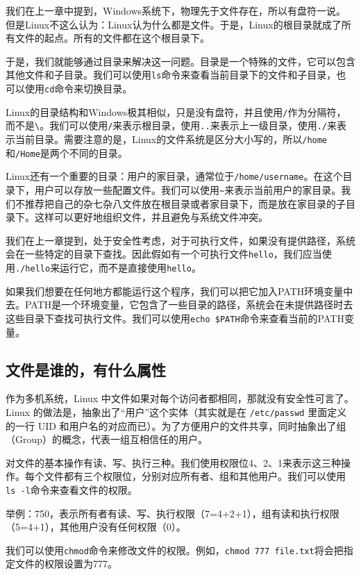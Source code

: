 \documentclass[../main.tex]{subfiles}
\begin{document}
我们在上一章中提到，Windows系统下，物理先于文件存在，所以有盘符一说。但是Linux不这么认为：Linux认为什么都是文件。于是，Linux的根目录\text{/}就成了所有文件的起点。所有的文件都在这个根目录下。

于是，我们就能够通过目录来解决这一问题。目录是一个特殊的文件，它可以包含其他文件和子目录。我们可以使用\texttt{ls}命令来查看当前目录下的文件和子目录，也可以使用\texttt{cd}命令来切换目录。

Linux的目录结构和Windows极其相似，只是没有盘符，并且使用\texttt{/}作为分隔符，而不是\texttt{\textbackslash}。我们可以使用\texttt{/}来表示根目录，使用\texttt{..}来表示上一级目录，使用\texttt{./}来表示当前目录。需要注意的是，Linux的文件系统是区分大小写的，所以\texttt{/home}和\texttt{/Home}是两个不同的目录。

Linux还有一个重要的目录：用户的家目录，通常位于\texttt{/home/username}。在这个目录下，用户可以存放一些配置文件。我们可以使用\texttt{\textasciitilde}来表示当前用户的家目录。我们不推荐把自己的杂七杂八文件放在根目录或者家目录下，而是放在家目录的子目录下。这样可以更好地组织文件，并且避免与系统文件冲突。

我们在上一章提到，处于安全性考虑，对于可执行文件，如果没有提供路径，系统会在一些特定的目录下查找。因此假如有一个可执行文件\texttt{hello}，我们应当使用\texttt{./hello}来运行它，而不是直接使用\texttt{hello}。

如果我们想要在任何地方都能运行这个程序，我们可以把它加入PATH环境变量中去。PATH是一个环境变量，它包含了一些目录的路径，系统会在未提供路径时去这些目录下查找可执行文件。我们可以使用\texttt{echo \$PATH}命令来查看当前的PATH变量。

\subsection{文件是谁的，有什么属性}

作为多机系统，Linux 中文件如果对每个访问者都相同，那就没有安全性可言了。Linux 的做法是，抽象出了“用户”这个实体（其实就是在 \texttt{/etc/passwd} 里面定义的一行 UID 和用户名的对应而已）。为了方便用户的文件共享，同时抽象出了组（Group）的概念，代表一组互相信任的用户。

对文件的基本操作有读、写、执行三种。我们使用权限位4、2、1来表示这三种操作。每个文件都有三个权限位，分别对应所有者、组和其他用户。我们可以使用\texttt{ls -l}命令来查看文件的权限。

举例：750，表示所有者有读、写、执行权限（7=4+2+1），组有读和执行权限（5=4+1），其他用户没有任何权限（0）。

我们可以使用\texttt{chmod}命令来修改文件的权限。例如，\texttt{chmod 777 file.txt}将会把指定文件的权限设置为777。
\end{document}
